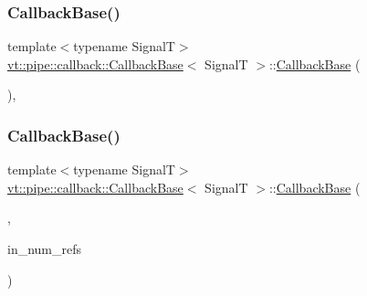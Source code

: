\subsubsection{\texorpdfstring{Callback\+Base()}{CallbackBase()}\hspace{0.1cm}{\footnotesize\ttfamily [5/7]}}
{\footnotesize\ttfamily template$<$typename SignalT$>$ \\
\hyperlink{structvt_1_1pipe_1_1callback_1_1_callback_base}{vt\+::pipe\+::callback\+::\+Callback\+Base}$<$ SignalT $>$\+::\hyperlink{structvt_1_1pipe_1_1callback_1_1_callback_base}{Callback\+Base} (\begin{DoxyParamCaption}\item[{Callback\+Single\+Use\+Tag\+Type}]{ }\end{DoxyParamCaption})\hspace{0.3cm}{\ttfamily [inline]}, {\ttfamily [explicit]}}

\mbox{\label{structvt_1_1pipe_1_1callback_1_1_callback_base_a2abdcbd2debf98179075077783a1b725}} 
\subsubsection{\texorpdfstring{Callback\+Base()}{CallbackBase()}\hspace{0.1cm}{\footnotesize\ttfamily [6/7]}}
{\footnotesize\ttfamily template$<$typename SignalT$>$ \\
\hyperlink{structvt_1_1pipe_1_1callback_1_1_callback_base}{vt\+::pipe\+::callback\+::\+Callback\+Base}$<$ SignalT $>$\+::\hyperlink{structvt_1_1pipe_1_1callback_1_1_callback_base}{Callback\+Base} (\begin{DoxyParamCaption}\item[{Callback\+Multi\+Use\+Tag\+Type}]{,  }\item[{\hyperlink{namespacevt_ace18d74dd489d9ea506d38789fffce34}{Pipe\+Ref\+Type} const \&}]{in\+\_\+num\+\_\+refs }\end{DoxyParamCaption})\hspace{0.3cm}{\ttfamily [inline]}}

\mbox{\label{structvt_1_1pipe_1_1callback_1_1_callback_base_aed70ff142d52c21d9f18e52eb6a6e38b}} 
